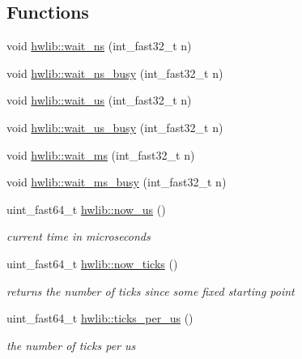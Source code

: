 \subsection*{Functions}
\begin{DoxyCompactItemize}
\item 
void \hyperlink{namespacehwlib_a9c01a1d0319f5eadd8926e66aea19aa0}{hwlib\+::wait\+\_\+ns} (int\+\_\+fast32\+\_\+t n)
\item 
void \hyperlink{namespacehwlib_a7f8f4b0176df290091ac1d2cbaede23b}{hwlib\+::wait\+\_\+ns\+\_\+busy} (int\+\_\+fast32\+\_\+t n)
\item 
void \hyperlink{namespacehwlib_a0096b739fc566c896366ecbd3113cc1e}{hwlib\+::wait\+\_\+us} (int\+\_\+fast32\+\_\+t n)
\item 
void \hyperlink{namespacehwlib_a9ebdd2f578adeea0543e9c99778e2459}{hwlib\+::wait\+\_\+us\+\_\+busy} (int\+\_\+fast32\+\_\+t n)
\item 
void \hyperlink{namespacehwlib_a6119aa5d3034176aa1515ef4bb193044}{hwlib\+::wait\+\_\+ms} (int\+\_\+fast32\+\_\+t n)
\item 
void \hyperlink{namespacehwlib_a15a3f36ce8b3f31473cdd8026b7e5960}{hwlib\+::wait\+\_\+ms\+\_\+busy} (int\+\_\+fast32\+\_\+t n)
\item 
uint\+\_\+fast64\+\_\+t \hyperlink{namespacehwlib_a27573ff04679de98f9325a8d9cff7a14}{hwlib\+::now\+\_\+us} ()
\begin{DoxyCompactList}\small\item\em current time in microseconds \end{DoxyCompactList}\item 
uint\+\_\+fast64\+\_\+t \hyperlink{namespacehwlib_a004512830e68d72d8fd0e3153895e65b}{hwlib\+::now\+\_\+ticks} ()
\begin{DoxyCompactList}\small\item\em returns the number of ticks since some fixed starting point \end{DoxyCompactList}\item 
uint\+\_\+fast64\+\_\+t \hyperlink{namespacehwlib_a0d513bcd3062ebfea65bcb2c82e0c1a8}{hwlib\+::ticks\+\_\+per\+\_\+us} ()
\begin{DoxyCompactList}\small\item\em the number of ticks per us \end{DoxyCompactList}\end{DoxyCompactItemize}
